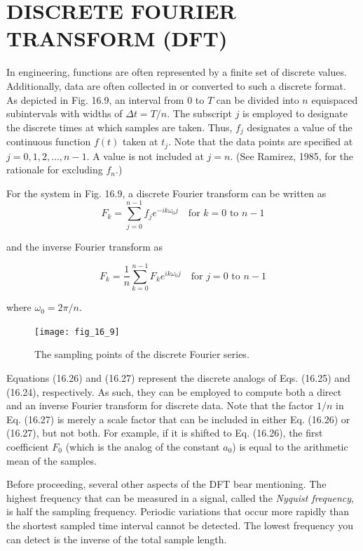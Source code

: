\documentclass[../main.tex]{subfiles}
\begin{document}
\label{cha:cha_P_16_5} %
\section{DISCRETE FOURIER TRANSFORM (DFT)}

\noindent In engineering, functions are often represented by a finite set of discrete values. Additionally, data are often collected in or converted to such a discrete format. As depicted in
Fig. 16.9, an interval from 0 to $T$ can be divided into $n$ equispaced subintervals with widths
of $\Delta t = T /n$. The subscript $j$ is employed to designate the discrete times at which samples
are taken. Thus, $f_j$ designates a value of the continuous function $f(t)$ taken at $t_j$. Note that the
data points are specified at $j = 0, 1, 2, \dots , n - 1$. A value is not included at $j = n$. (See
Ramirez, 1985, for the rationale for excluding $f_n$.)

For the system in Fig. 16.9, a discrete Fourier transform can be written as
\begin{equation}
	\tag{16.26}
	F_k = \sum ^ {n-1} _ {j=0} f_j e ^ {-ik \omega_0 j} \quad \text{for } k=0 \text{ to } n - 1
\end{equation}

\noindent and the inverse Fourier transform as

\begin{equation}
	\tag{16.27}
	F_k = \frac{1}{n} \sum ^ {n-1} _ {k=0} F_k e ^ {ik \omega_0 j} \quad \text{for } j=0 \text{ to } n - 1
\end{equation}

\noindent where $\omega_0 = 2 \pi / n$.

\begin{figure}[H] 
	\centering
	\texttt{[image: fig\_16\_9]}
	\caption{\textsf{The sampling points of the discrete Fourier series.}}
	\label{fig:fig_16_9}
\end{figure}

Equations (16.26) and (16.27) represent the discrete analogs of Eqs. (16.25) and
(16.24), respectively. As such, they can be employed to compute both a direct and an inverse Fourier transform for discrete data. Note that the factor $1/n$ in Eq. (16.27) is merely
a scale factor that can be included in either Eq. (16.26) or (16.27), but not both. For example, if it is shifted to Eq. (16.26), the first coefficient $F_0$ (which is the analog of the constant
$a_0$) is equal to the arithmetic mean of the samples.

Before proceeding, several other aspects of the DFT bear mentioning. The highest frequency that can be measured in a signal, called the \textit{Nyquist frequency}, is half the sampling
frequency. Periodic variations that occur more rapidly than the shortest sampled time interval cannot be detected. The lowest frequency you can detect is the inverse of the total
sample length.
\end{document}
